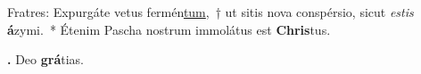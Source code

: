 
Fratres: Expurgáte vetus fermén\underline{tum},~† ut sitis nova conspérsio, sicut \textit{estis} \textbf{á}zymi.~* Étenim Pascha nostrum immolátus est \textbf{Chris}tus.

\textbf{\Rbar.} Deo \textbf{grá}tias.

